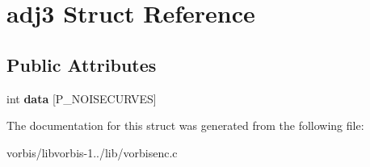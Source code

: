 \hypertarget{structadj3}{\section{adj3 Struct Reference}
\label{structadj3}
}
\subsection*{Public Attributes}
\begin{DoxyCompactItemize}
\item 
\hypertarget{structadj3_a8e4ba16608676b405538b4687c23f810}{int {\bfseries data} \mbox{[}P\+\_\+\+N\+O\+I\+S\+E\+C\+U\+R\+V\+E\+S\mbox{]}}\label{structadj3_a8e4ba16608676b405538b4687c23f810}

\end{DoxyCompactItemize}


The documentation for this struct was generated from the following file\+:\begin{DoxyCompactItemize}
\item 
vorbis/libvorbis-\/1../lib/vorbisenc.\+c\end{DoxyCompactItemize}
